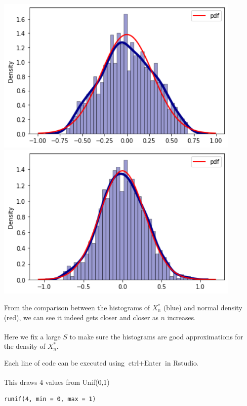 \begin{exercise}
\begin{solution}
 \begin{minipage}{0.45\textwidth}
 	\includegraphics[width=0.9\textwidth]{1n2} 
 	\includegraphics[width=0.9\textwidth]{1n20} 
 \end{minipage}
 \begin{minipage}[b]{0.45\textwidth}
 	From the comparison between the histograms of $X^*_n$ (blue) and normal density (red), we can see it indeed gets closer and closer as $n$ increases. \\~\\
 	Here we fix a large $S$ to make sure the histograms are good approximations for the density of $X_n^*$. 
 \end{minipage}
\newline
Each line of code can be executed using $\text{ctrl}+\text{Enter}$ in Rstudio.  
~\\~\\
This draws 4 values from Unif(0,1)
\begin{verbatim}
runif(4, min = 0, max = 1)
\end{verbatim}

\end{solution}
\end{exercise}
